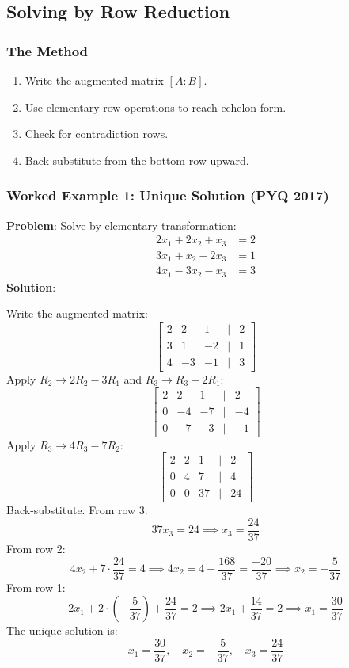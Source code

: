 \documentclass[
]{article}
\providecommand{\tightlist}{%
  \setlength{\itemsep}{0pt}\setlength{\parskip}{0pt}}
\begin{document}
\subsection{Solving by Row Reduction}\label{solving-by-row-reduction}

\subsubsection{The Method}\label{the-method-4}

\begin{enumerate}
\def\labelenumi{\arabic{enumi}.}
\tightlist
\item
  Write the augmented matrix \([A:B]\).
\item
  Use elementary row operations to reach echelon form.
\item
  Check for contradiction rows.
\item
  Back-substitute from the bottom row upward.
\end{enumerate}

\subsubsection{Worked Example 1: Unique Solution (PYQ
2017)}\label{worked-example-1-unique-solution-pyq-2017}

\textbf{Problem}: Solve by elementary transformation:
\[
\begin{aligned}
2x_1 + 2x_2 + x_3 &= 2 \\
3x_1 + x_2 - 2x_3 &= 1 \\
4x_1 - 3x_2 - x_3 &= 3
\end{aligned}
\]
\textbf{Solution}:

Write the augmented matrix:
\[
\begin{bmatrix}
2 & 2 & 1 & | & 2 \\
3 & 1 & -2 & | & 1 \\
4 & -3 & -1 & | & 3
\end{bmatrix}
\]
Apply \(R_2 \to 2R_2 - 3R_1\) and \(R_3 \to R_3 - 2R_1\):
\[
\begin{bmatrix}
2 & 2 & 1 & | & 2 \\
0 & -4 & -7 & | & -4 \\
0 & -7 & -3 & | & -1
\end{bmatrix}
\]
Apply \(R_3 \to 4R_3 - 7R_2\):
\[
\begin{bmatrix}
2 & 2 & 1 & | & 2 \\
0 & 4 & 7 & | & 4 \\
0 & 0 & 37 & | & 24
\end{bmatrix}
\]
Back-substitute. From row 3:
\[
37x_3 = 24 \implies x_3 = \frac{24}{37}
\]
From row 2:
\[
4x_2 + 7 \cdot \frac{24}{37} = 4 \implies 4x_2 = 4 - \frac{168}{37} = \frac{-20}{37} \implies x_2 = -\frac{5}{37}
\]
From row 1:
\[
2x_1 + 2 \cdot \left(-\frac{5}{37}\right) + \frac{24}{37} = 2 \implies 2x_1 + \frac{14}{37} = 2 \implies x_1 = \frac{30}{37}
\]
The unique solution is:
\[
x_1 = \frac{30}{37}, \quad x_2 = -\frac{5}{37}, \quad x_3 = \frac{24}{37}
\]
\end{document}
